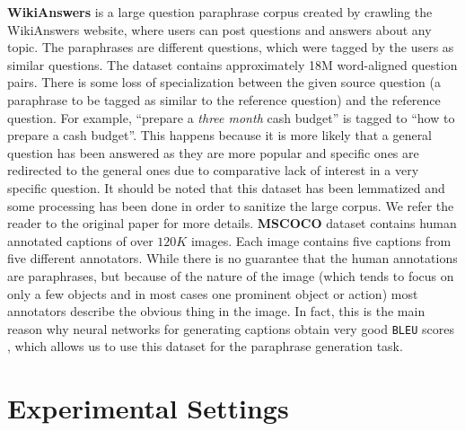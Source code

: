 \textbf{WikiAnswers} \cite{fader2013paraphrase} is a large question paraphrase corpus created by crawling the WikiAnswers website, where users can post questions and answers about any topic. The paraphrases are different questions, which were tagged by the users as similar questions. The dataset contains approximately 18M word-aligned question pairs. There is some loss of specialization between the given source question (a paraphrase to be tagged as similar to the reference question) and the reference question. For example, ``prepare a \emph{three month} cash budget'' is tagged to ``how to prepare a cash budget''. This happens because it is more likely that a general question has been answered as they are more popular and specific ones are redirected to the general ones due to comparative lack of interest in a very specific question. It should be noted that this dataset has been lemmatized and some processing has been done in order to sanitize the large corpus. We refer the reader to the original paper for more details.
\textbf{MSCOCO} \cite{lin2014microsoft} dataset contains human annotated captions of over $120K$ images. Each image contains five captions from five different annotators. While there is no guarantee that the human annotations are paraphrases, but because of the nature of the image (which tends to focus on only a few objects and in most cases one prominent object or action) most annotators describe the obvious thing in the image. In fact, this is the main reason why neural networks for generating captions obtain very good \texttt{BLEU} scores \cite{VinyalsTBE14}, which allows us to use this dataset for the paraphrase generation task.
 
 
 
\section{Experimental Settings}
